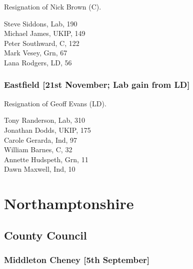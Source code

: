 \documentclass[a4paper,openany,10pt]{book}
\begin{document}

Resignation of Nick Brown (C).



Steve Siddons, Lab, 190\\
Michael James, UKIP, 149\\
Peter Southward, C, 122\\
Mark Vesey, Grn, 67\\
Lana Rodgers, LD, 56\\


\subsubsection*{Eastfield \hspace*{\fill}\nolinebreak[1]%
\enspace\hspace*{\fill}
[21st November; Lab gain from LD]}


Resignation of Geoff Evans (LD).



Tony Randerson, Lab, 310\\
Jonathan Dodds, UKIP, 175\\
Carole Gerarda, Ind, 97\\
William Barnes, C, 32\\
Annette Hudspeth, Grn, 11\\
Dawn Maxwell, Ind, 10\\


\section[Northamptonshire]{{Northamptonshire}}

\subsection*{County Council}

\subsubsection*{Middleton Cheney \hspace*{\fill}\nolinebreak[1]%
\enspace\hspace*{\fill}
[5th September]}

\end{document}

